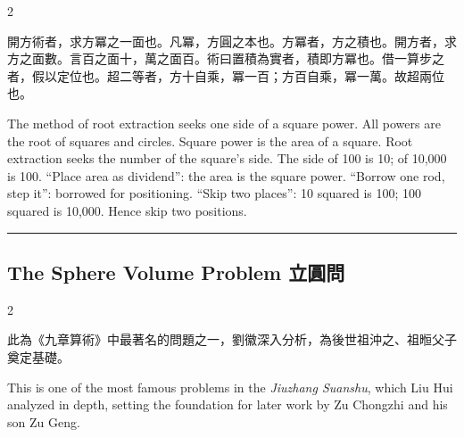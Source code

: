 \documentclass[10pt,a4paper]{article}
\newcommand{\longline}{\noindent\rule{\textwidth}{0.4pt}}
\begin{document}
\begin{paracol}{2}

\begin{leftcolumn*}
\begin{commentarybi}
開方術者，求方冪之一面也。凡冪，方圓之本也。方冪者，方之積也。開方者，求方之面數。言百之面十，萬之面百。術曰置積為實者，積即方冪也。借一算步之者，假以定位也。超二等者，方十自乘，冪一百；方百自乘，冪一萬。故超兩位也。
\end{commentarybi}
\end{leftcolumn*}

\begin{rightcolumn*}
\begin{commentarybi}
The method of root extraction seeks one side of a square power. All powers are the root of squares and circles. Square power is the area of a square. Root extraction seeks the number of the square's side. The side of 100 is 10; of 10,000 is 100. ``Place area as dividend'': the area is the square power. ``Borrow one rod, step it'': borrowed for positioning. ``Skip two places'': 10 squared is 100; 100 squared is 10,000. Hence skip two positions.
\end{commentarybi}
\end{rightcolumn*}

\end{paracol}

\vspace{0.3cm}
\longline
\vspace{0.3cm}

\subsection{The Sphere Volume Problem 立圓問}

\begin{paracol}{2}

\begin{leftcolumn*}
此為《九章算術》中最著名的問題之一，劉徽深入分析，為後世祖沖之、祖暅父子奠定基礎。
\end{leftcolumn*}

\begin{rightcolumn*}
This is one of the most famous problems in the \textit{Jiuzhang Suanshu}, which Liu Hui analyzed in depth, setting the foundation for later work by Zu Chongzhi and his son Zu Geng.
\end{rightcolumn*}

\end{paracol}
\end{document}
